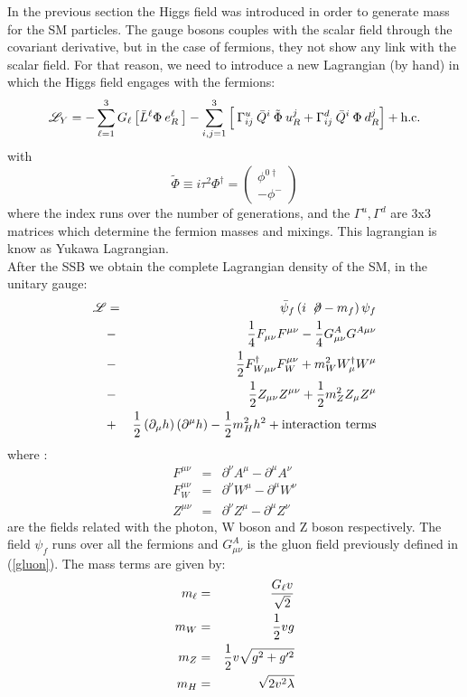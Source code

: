 In the previous section the Higgs field was introduced in order to generate mass for the SM particles. The gauge bosons couples with the scalar field through the covariant derivative, but in the case of fermions, they not show 
any link with the scalar field. For that reason, we need to
introduce a new Lagrangian (by hand) in which the Higgs field engages with the fermions: 
\begin{equation}\label{yukawa}
\mathscr{L}_{Y}=-\sum_{\ell=1}^{3} G_{\ell}\left[\bar{L}^{\ell}\Phi\:e^{\ell}_{R}\:\right]- \sum_{i,j=1}^{3}\left[\:\Gamma^{u}_{ij}\:\bar{Q}^{i}\:\tilde{\Phi}\:u^{j}_{R} + \Gamma^{d}_{ij}\:\bar{Q}^{i}\:\Phi\: d^{j}_{R}  \right]  
+\hbox{h.c.} 
\end{equation}
with
\begin{equation}
\tilde{\Phi} \equiv i\tau^{2}\Phi^{\dag}=\left(\begin{array}{c}
\phi^{0 \dag}\\
-\phi^{-}
\end{array}\right) 
\end{equation}
where the index runs over the number of generations, and the $\Gamma^{u},\Gamma^{d}$ are 3x3 matrices which determine the fermion masses and mixings.
This lagrangian is know as Yukawa Lagrangian.\\
After the SSB we obtain the complete Lagrangian density of the SM, in the unitary gauge:
\begin{eqnarray}
\mathscr{L} &=& \bar{\psi}_{f}\left(i \:\not\! \partial-m_{f} \right)\psi_{f}\nonumber\\
&-&\dfrac{1}{4}F_{\mu\nu}F^{\mu\nu}-\dfrac{1}{4}G^{A}_{\mu\nu}G^{A \mu\nu}\nonumber\\
&-&\dfrac{1}{2}F^{\dag}_{W \mu\nu}F^{\mu\nu}_{W} + m_{W}^{2}W^{\dag}_{\mu}W^{\mu}\nonumber\\
&-&\dfrac{1}{2}Z_{\mu\nu}Z^{\mu\nu} +\dfrac{1}{2}m_{Z}^{2}Z_{\mu}Z^{\mu}\nonumber\\
&+& \dfrac{1}{2} \left(\partial_{\mu} h \right)\left(\partial^{\mu} h \right)- \dfrac{1}{2} m_{H}^{2}h^{2} + \text{interaction terms}   
\end{eqnarray}
where :
\begin{eqnarray}
F^{\mu\nu} &=& \partial^{\nu}A^{\mu}-\partial^{\mu}A^{\nu} \nonumber\\
F^{\mu\nu}_{W} &=& \partial^{\nu}W^{\mu}-\partial^{\mu}W^{\nu} \nonumber\\
Z^{\mu\nu} &=& \partial^{\nu}Z^{\mu}-\partial^{\mu}Z^{\nu}
\end{eqnarray}
are the fields related with the photon, W boson and Z boson respectively. The field $\psi_{f}$ runs over all the fermions and   $G^{A}_{\mu\nu}$ is the gluon field previously defined in (\ref{gluon}). The mass terms are given by:
\begin{eqnarray}
m_{\ell} &=& \dfrac{G_{\ell} v}{\sqrt{2}}\\
m_{W} &=& \dfrac{1}{2} vg\\
m_{Z} &=& \dfrac{1}{2} v\sqrt{g^{2}+g'^{2}}\\
m_{H} &=& \sqrt{ 2 v^{2} \lambda}
\end{eqnarray}



